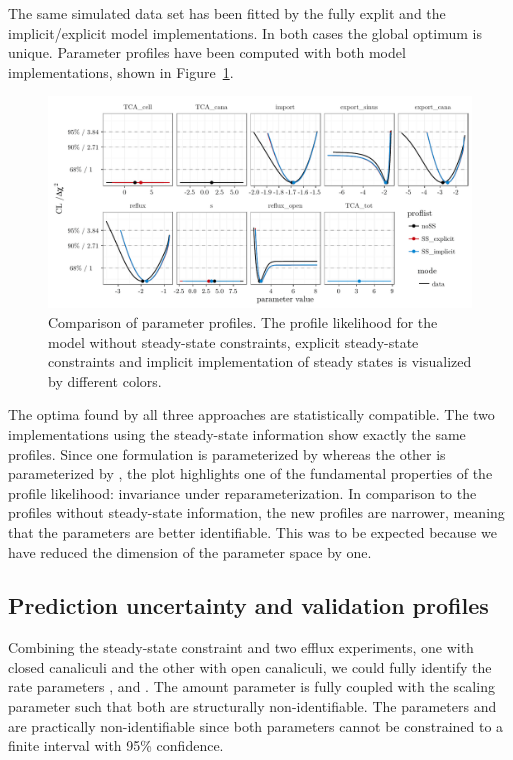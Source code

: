 \documentclass[article]{jss}
\begin{document}
The same simulated data set has been fitted by the fully explit and the implicit/explicit model implementations. In both cases the global optimum is unique. Parameter profiles have been computed with both model implementations, shown in Figure~\ref{fig:allprofiles}.
\begin{figure}[ht]
	\centering
	\includegraphics[width = \textwidth]{images/figure8}
	\caption{Comparison of parameter profiles. The profile likelihood for the model without steady-state constraints, explicit steady-state constraints and implicit implementation of steady states is visualized by different colors.}
	\label{fig:allprofiles}
\end{figure}
The optima found by all three approaches are statistically compatible. The two implementations using the steady-state information show exactly the same profiles. Since one formulation is parameterized by  whereas the other is parameterized by , the plot highlights one of the fundamental properties of the profile likelihood: invariance under reparameterization. In comparison to the profiles without steady-state information, the new profiles are narrower, meaning that the parameters are better identifiable. This was to be expected because we have reduced the dimension of the parameter space by one.

\subsection{Prediction uncertainty and validation profiles}

Combining the steady-state constraint and two efflux experiments, one with closed canaliculi and the other with open canaliculi, we could fully identify the rate parameters ,  and . The amount parameter  is fully coupled with the scaling parameter  such that both are structurally non-identifiable. The parameters  and  are practically non-identifiable since both parameters cannot be constrained to a finite interval with 95\% confidence.
\end{document}
